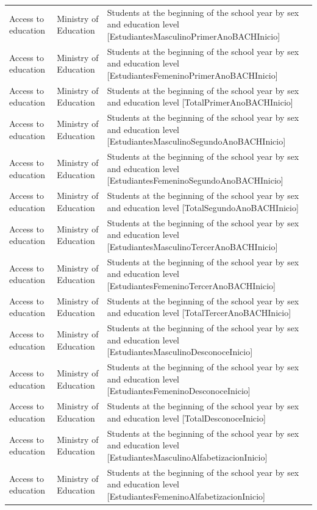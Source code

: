 \documentclass[10pt,a4paper]{article}
\begin{document}
\begin{longtable}{@{}>{\raggedright\arraybackslash}p{3.5cm}>{\raggedright\arraybackslash}p{5.6cm}>{\raggedright\arraybackslash}p{\dimexpr\textwidth-9.1cm-4\tabcolsep\relax}@{}}
Access to education & Ministry of Education & Students at the beginning of the school year by sex and education level [EstudiantesMasculinoPrimerAnoBACHInicio]\\
Access to education & Ministry of Education & Students at the beginning of the school year by sex and education level [EstudiantesFemeninoPrimerAnoBACHInicio]\\
Access to education & Ministry of Education & Students at the beginning of the school year by sex and education level [TotalPrimerAnoBACHInicio]\\
Access to education & Ministry of Education & Students at the beginning of the school year by sex and education level [EstudiantesMasculinoSegundoAnoBACHInicio]\\
Access to education & Ministry of Education & Students at the beginning of the school year by sex and education level [EstudiantesFemeninoSegundoAnoBACHInicio]\\
Access to education & Ministry of Education & Students at the beginning of the school year by sex and education level [TotalSegundoAnoBACHInicio]\\
Access to education & Ministry of Education & Students at the beginning of the school year by sex and education level [EstudiantesMasculinoTercerAnoBACHInicio]\\
Access to education & Ministry of Education & Students at the beginning of the school year by sex and education level [EstudiantesFemeninoTercerAnoBACHInicio]\\
Access to education & Ministry of Education & Students at the beginning of the school year by sex and education level [TotalTercerAnoBACHInicio]\\
Access to education & Ministry of Education & Students at the beginning of the school year by sex and education level [EstudiantesMasculinoDesconoceInicio]\\
Access to education & Ministry of Education & Students at the beginning of the school year by sex and education level [EstudiantesFemeninoDesconoceInicio]\\
Access to education & Ministry of Education & Students at the beginning of the school year by sex and education level [TotalDesconoceInicio]\\
Access to education & Ministry of Education & Students at the beginning of the school year by sex and education level [EstudiantesMasculinoAlfabetizacionInicio]\\
Access to education & Ministry of Education & Students at the beginning of the school year by sex and education level [EstudiantesFemeninoAlfabetizacionInicio]\\

\end{longtable}
\end{document}
